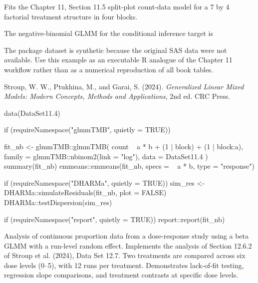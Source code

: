 \documentclass[a4paper]{book}
\begin{document}
%
\begin{Description}
Fits the Chapter 11, Section 11.5 split-plot count-data model for a
7 by 4 factorial treatment structure in four blocks.
\end{Description}
%
\begin{Details}
The negative-binomial GLMM for the conditional inference target is
\end{Details}
%
\begin{Note}
The package dataset is synthetic because the original 
SAS data were not available. Use this example as an executable R analogue
of the Chapter 11 workflow rather than as a numerical reproduction of all
book tables.
\end{Note}
%
\begin{References}
Stroup, W. W., Ptukhina, M., and Garai, S. (2024).
\emph{Generalized Linear Mixed Models: Modern Concepts, Methods and
Applications}, 2nd ed. CRC Press.
\end{References}
%
\begin{SeeAlso}
\end{SeeAlso}
%
\begin{Examples}
\begin{ExampleCode}
data(DataSet11.4)

if (requireNamespace("glmmTMB", quietly = TRUE)) {
  fit_nb <- glmmTMB::glmmTMB(
    count ~ a * b + (1 | block) + (1 | block:a),
    family = glmmTMB::nbinom2(link = "log"),
    data = DataSet11.4
  )
  summary(fit_nb)
  emmeans::emmeans(fit_nb, specs = ~ a * b, type = "response")

  if (requireNamespace("DHARMa", quietly = TRUE)) {
    sim_res <- DHARMa::simulateResiduals(fit_nb, plot = FALSE)
    DHARMa::testDispersion(sim_res)
  }

  if (requireNamespace("report", quietly = TRUE)) {
    report::report(fit_nb)
  }
}
\end{ExampleCode}
\end{Examples}
%
\begin{Description}
Analysis of continuous proportion data from a dose-response study using
a beta GLMM with a run-level random effect.  Implements the analysis of
Section 12.6.2 of Stroup et al. (2024), Data Set 12.7.  Two treatments
are compared across six dose levels (0–5), with 12 runs per treatment.
Demonstrates lack-of-fit testing, regression slope comparisons, and
treatment contrasts at specific dose levels.
\end{Description}
\end{document}
